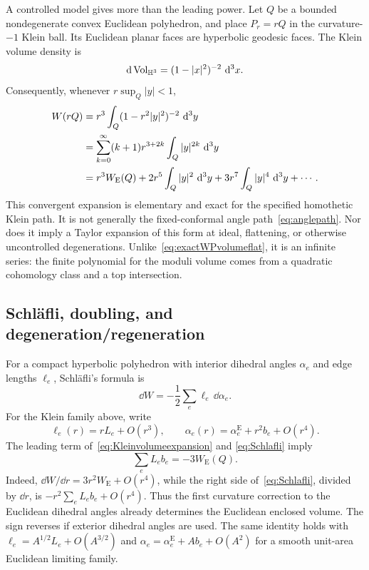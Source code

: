A controlled model gives more than the leading power. Let $Q$ be a
bounded nondegenerate convex Euclidean polyhedron, and place $P_r=rQ$ in
the curvature-$-1$ Klein ball. Its Euclidean planar faces are
hyperbolic geodesic faces. The Klein volume density is
\[
 \mathop{}\!\mathrm d\operatorname{Vol}_{\mathbb H^3}=(1-|x|^2)^{-2}\,\mathop{}\!\mathrm d^3x.
\]
Consequently, whenever $r\sup_Q|y|<1$,
\begin{align}
 W(rQ)
 &=r^3\int_Q(1-r^2|y|^2)^{-2}\,\mathop{}\!\mathrm d^3y\notag\\
 &=\sum_{k=0}^{\infty}(k+1)r^{3+2k}
                         \int_Q|y|^{2k}\,\mathop{}\!\mathrm d^3y\notag\\
 &=r^3 W_{\mathrm E}(Q)
      +2r^5\int_Q|y|^2\,\mathop{}\!\mathrm d^3y
      +3r^7\int_Q|y|^4\,\mathop{}\!\mathrm d^3y+\cdots.
 \label{eq:Kleinvolumeexpansion}
\end{align}
This convergent expansion is elementary and exact for the specified
homothetic Klein path. It is not generally the fixed-conformal
angle path~\eqref{eq:anglepath}. Nor does it imply a Taylor expansion
of this form at ideal, flattening, or otherwise uncontrolled
degenerations. Unlike~\eqref{eq:exactWPvolumeflat}, it is an infinite
series: the finite polynomial for the moduli volume comes from a
quadratic cohomology class and a top intersection.

\subsection{Schl\"afli, doubling, and degeneration/regeneration}

For a compact hyperbolic polyhedron with interior dihedral angles
$\alpha_e$ and edge lengths $\ell_e$, Schl\"afli's formula is
\begin{equation}
 \dd W=-\frac12\sum_e\ell_e\,\dd\alpha_e.
 \label{eq:Schlafli}
\end{equation}
For the Klein family above, write
\[
 \ell_e(r)=rL_e+O(r^3),\qquad
 \alpha_e(r)=\alpha_e^{\mathrm E}+r^2b_e+O(r^4).
\]
The leading term of~\eqref{eq:Kleinvolumeexpansion} and
\eqref{eq:Schlafli} imply
\begin{equation}
 \boxed{\quad\sum_eL_e b_e=-3W_{\mathrm E}(Q).\quad}
 \label{eq:firstcurvaturevolume}
\end{equation}
Indeed, $\dd W/\dd r=3r^2W_{\mathrm E}+O(r^4)$, while
the right side of~\eqref{eq:Schlafli}, divided by $\dd r$, is
$-r^2\sum_eL_e b_e+O(r^4)$. Thus the first curvature correction
to the Euclidean dihedral angles already determines the Euclidean
enclosed volume. The sign reverses if exterior dihedral angles are
used. The same identity holds with
$\ell_e=A^{1/2}L_e+O(A^{3/2})$ and
$\alpha_e=\alpha_e^{\mathrm E}+A b_e+O(A^2)$ for a smooth
unit-area Euclidean limiting family.

